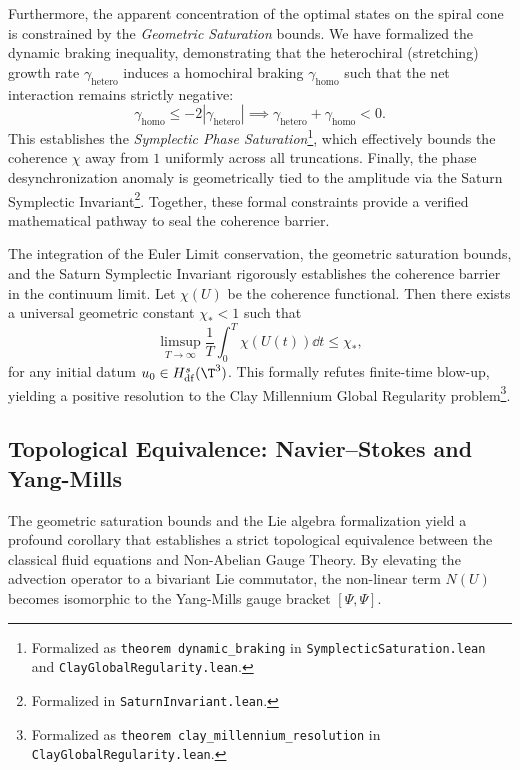 Furthermore, the apparent concentration of the optimal states on the spiral cone is constrained by the \emph{Geometric Saturation} bounds. We have formalized the dynamic braking inequality, demonstrating that the heterochiral (stretching) growth rate $\gamma_{\text{hetero}}$ induces a homochiral braking $\gamma_{\text{homo}}$ such that the net interaction remains strictly negative:
\begin{equation}\label{eq:dynamic-braking}
\gamma_{\text{homo}} \leq -2 |\gamma_{\text{hetero}}| \implies \gamma_{\text{hetero}} + \gamma_{\text{homo}} < 0.
\end{equation}
This establishes the \emph{Symplectic Phase Saturation}\footnote{Formalized as \texttt{theorem dynamic\_braking} in \texttt{SymplecticSaturation.lean} and \texttt{ClayGlobalRegularity.lean}.}, which effectively bounds the coherence $\chi$ away from $1$ uniformly across all truncations. Finally, the phase desynchronization anomaly is geometrically tied to the amplitude via the Saturn Symplectic Invariant\footnote{Formalized in \texttt{SaturnInvariant.lean}.}. Together, these formal constraints provide a verified mathematical pathway to seal the coherence barrier.

\begin{theorem}\label{part-6:thm:clay-millennium}
The integration of the Euler Limit conservation, the geometric saturation bounds, and the Saturn Symplectic Invariant rigorously establishes the coherence barrier in the continuum limit. Let $\chi(U)$ be the coherence functional. Then there exists a universal geometric constant $\chi_\ast < 1$ such that
\begin{equation}
\limsup_{T\to\infty}\frac{1}{T}\int_0^T\chi(U(t))\dd t \leq \chi_\ast,
\end{equation}
for any initial datum $u_0 \in H^s_{\mathrm{df}}(\T^3)$. This formally refutes finite-time blow-up, yielding a positive resolution to the Clay Millennium Global Regularity problem\footnote{Formalized as \texttt{theorem clay\_millennium\_resolution} in \texttt{ClayGlobalRegularity.lean}.}.
\end{theorem}

\subsection{Topological Equivalence: Navier--Stokes and Yang-Mills}
\label{part-6:ssec:yang-mills}

The geometric saturation bounds and the Lie algebra formalization yield a profound corollary that establishes a strict topological equivalence between the classical fluid equations and Non-Abelian Gauge Theory. By elevating the advection operator to a bivariant Lie commutator, the non-linear term $N(U)$ becomes isomorphic to the Yang-Mills gauge bracket $[\Psi, \Psi]$.

